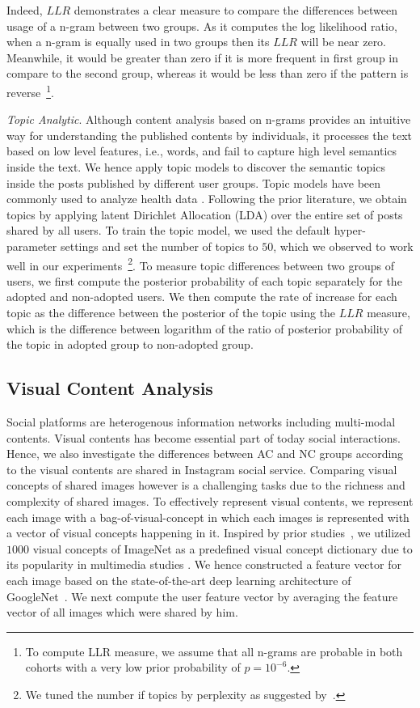 \documentclass{acm_proc_article-sp}
\begin{document}
Indeed, $LLR$ demonstrates a clear measure to compare the differences between usage of a n-gram between two groups. As it computes the log likelihood ratio, when a n-gram is equally used in two groups then its $LLR$  will be near zero. Meanwhile, it would be greater than zero if it is more frequent in first group in compare to the second group, whereas it would be less than zero if the pattern is reverse~\footnote{To compute LLR measure, we assume that all n-grams are probable in both cohorts with a very low prior probability of $p = 10^{-6}$.}.

\emph{Topic Analytic}.
Although content analysis based on n-grams provides an intuitive way for understanding the published contents by individuals, it processes the text based on low level features, i.e., words, and fail to capture high level semantics inside the text. We hence apply topic models to discover the semantic topics inside the posts published by different user groups. Topic models have been commonly used to analyze health data \cite{paul2014discovering}. Following the prior literature, we obtain topics by applying latent Dirichlet Allocation (LDA) over the entire set of posts shared by all users. To train the topic model, we used the default hyper-parameter settings and set the number of topics to $50$, which we observed to work well in our experiments~\footnote{We tuned the number if topics by perplexity as suggested by~\cite{wallach2009evaluation}.}. To measure topic differences between two groups of users, we first compute the posterior probability of each topic separately for the adopted and non-adopted users. We then compute the rate of increase for each topic as the difference between the posterior of the topic using the $LLR$ measure, which is the difference between logarithm of the ratio of posterior probability of the topic in adopted group to non-adopted group.

\subsection{Visual Content Analysis}
Social platforms are heterogenous information networks including multi-modal contents. Visual contents has become essential part of today social interactions. Hence, we also investigate the differences between AC and NC groups according to the visual contents are shared in Instagram social service. Comparing visual concepts of shared images however is a challenging tasks due to the richness and complexity of shared images. To effectively represent visual contents, we represent each image with a bag-of-visual-concept in which each images is represented with a vector of visual concepts happening in it. Inspired by prior studies~\cite{}, we utilized $1000$ visual concepts of ImageNet as a predefined visual concept dictionary due to its popularity in multimedia studies \cite{}. We hence constructed a feature vector for each image based on the state-of-the-art deep learning architecture of GoogleNet~\cite{}. We next compute the user feature vector by averaging the feature vector of all images which were shared by him.
\end{document}

